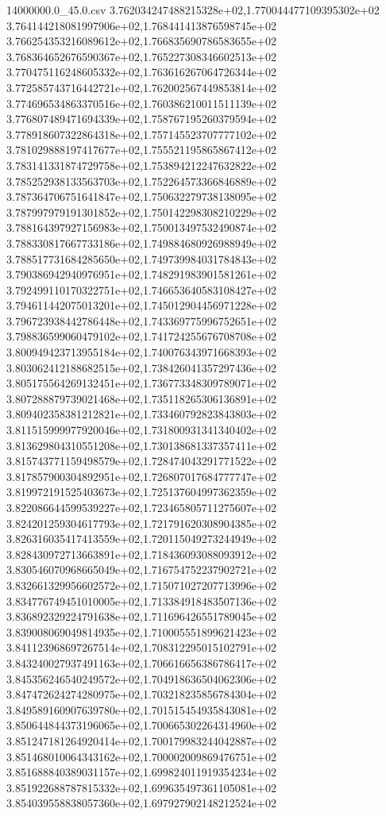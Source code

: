 \begin{filecontents*}{14000000.0_45.0.csv}
3.762034247488215328e+02,1.770044477109395302e+02
3.764144218081997906e+02,1.768441413876598745e+02
3.766254353216089612e+02,1.766835690786583655e+02
3.768364652676590367e+02,1.765227308346602513e+02
3.770475116248605332e+02,1.763616267064726344e+02
3.772585743716442721e+02,1.762002567449853814e+02
3.774696534863370516e+02,1.760386210011511139e+02
3.776807489471694339e+02,1.758767195260379594e+02
3.778918607322864318e+02,1.757145523707777102e+02
3.781029888197417677e+02,1.755521195865867412e+02
3.783141331874729758e+02,1.753894212247632822e+02
3.785252938133563703e+02,1.752264573366846889e+02
3.787364706751641847e+02,1.750632279738138095e+02
3.787997979191301852e+02,1.750142298308210229e+02
3.788164397927156983e+02,1.750013497532490874e+02
3.788330817667733186e+02,1.749884680926988949e+02
3.788517731684285650e+02,1.749739984031784843e+02
3.790386942940976951e+02,1.748291983901581261e+02
3.792499110170322751e+02,1.746653640583108427e+02
3.794611442075013201e+02,1.745012904456971228e+02
3.796723938442786448e+02,1.743369775996752651e+02
3.798836599060479102e+02,1.741724255676708708e+02
3.800949423713955184e+02,1.740076343971668393e+02
3.803062412188682515e+02,1.738426041357297436e+02
3.805175564269132451e+02,1.736773348309789071e+02
3.807288879739021468e+02,1.735118265306136891e+02
3.809402358381212821e+02,1.733460792823843803e+02
3.811515999977920046e+02,1.731800931341340402e+02
3.813629804310551208e+02,1.730138681337357411e+02
3.815743771159498579e+02,1.728474043291771522e+02
3.817857900304892951e+02,1.726807017684777747e+02
3.819972191525403673e+02,1.725137604997362359e+02
3.822086644599539227e+02,1.723465805711275607e+02
3.824201259304617793e+02,1.721791620308904385e+02
3.826316035417413559e+02,1.720115049273244949e+02
3.828430972713663891e+02,1.718436093088093912e+02
3.830546070968665049e+02,1.716754752237902721e+02
3.832661329956602572e+02,1.715071027207713996e+02
3.834776749451010005e+02,1.713384918483507136e+02
3.836892329224791638e+02,1.711696426551789045e+02
3.839008069049814935e+02,1.710005551899621423e+02
3.841123968697267514e+02,1.708312295015102791e+02
3.843240027937491163e+02,1.706616656386786417e+02
3.845356246540249572e+02,1.704918636504062306e+02
3.847472624274280975e+02,1.703218235856784304e+02
3.849589160907639780e+02,1.701515454935843081e+02
3.850644844373196065e+02,1.700665302264314960e+02
3.851247181264920414e+02,1.700179983244042887e+02
3.851468010064343162e+02,1.700002009869476751e+02
3.851688840389031157e+02,1.699824011919354234e+02
3.851922688787815332e+02,1.699635497361105081e+02
3.854039558838057360e+02,1.697927902148212524e+02

\end{filecontents*}

